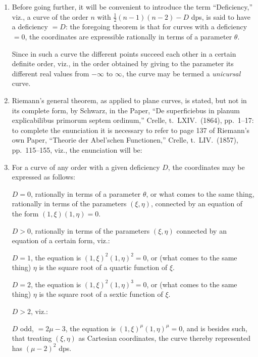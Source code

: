\documentclass[12pt,a4paper]{article}
\theoremstyle{plain}
\theoremstyle{definition}
\theoremstyle{remark}
\begin{document}
\begin{enumerate}[label=\arabic*.]
The demonstration may also be effected in a similar manner by means of curves of the order $n-2$.

\item Before going further, it will be convenient to introduce the term ``Deficiency,'' viz., a curve of the order $n$ with $\frac{1}{2}(n-1)(n-2) - D$ dps, is said to have a deficiency $= D$: the foregoing theorem is that for curves with a deficiency $= 0$, the coordinates are expressible rationally in terms of a parameter $\theta$.

Since in such a curve the different points succeed each other in a certain definite order, viz., in the order obtained by giving to the parameter its different real values from $-\infty$ to $\infty$, the curve may be termed a \emph{unicursal} curve.

\item Riemann's general theorem, as applied to plane curves, is stated, but not in its complete form, by Schwarz, in the Paper, ``De superficiebus in planum explicabilibus primorum septem ordinum,'' Crelle, t.~LXIV.\ (1864), pp.~1--17: to complete the enunciation it is necessary to refer to page 137 of Riemann's own Paper, ``Theorie der Abel'schen Functionen,'' Crelle, t.~LIV.\ (1857), pp.~115--155, viz., the enunciation will be:

\item For a curve of any order with a given deficiency $D$, the coordinates may be expressed as follows:

$D = 0$, rationally in terms of a parameter $\theta$, or what comes to the same thing, rationally in terms of the parameters $(\xi, \eta)$, connected by an equation of the form $(1,\xi)(1,\eta) = 0$.

$D > 0$, rationally in terms of the parameters $(\xi, \eta)$ connected by an equation of a certain form, viz.:

$D = 1$, the equation is $(1,\xi)^2(1,\eta)^2 = 0$, or (what comes to the same thing) $\eta$ is the square root of a quartic function of $\xi$.

$D = 2$, the equation is $(1,\xi)^2(1,\eta)^3 = 0$, or (what comes to the same thing) $\eta$ is the square root of a sextic function of $\xi$.

$D > 2$, viz.:

$D$ odd, $= 2\mu - 3$, the equation is $(1,\xi)^\mu(1,\eta)^\mu = 0$, and is besides such, that treating $(\xi, \eta)$ as Cartesian coordinates, the curve thereby represented has $(\mu - 2)^2$ dps.


\end{enumerate}
\end{document}
